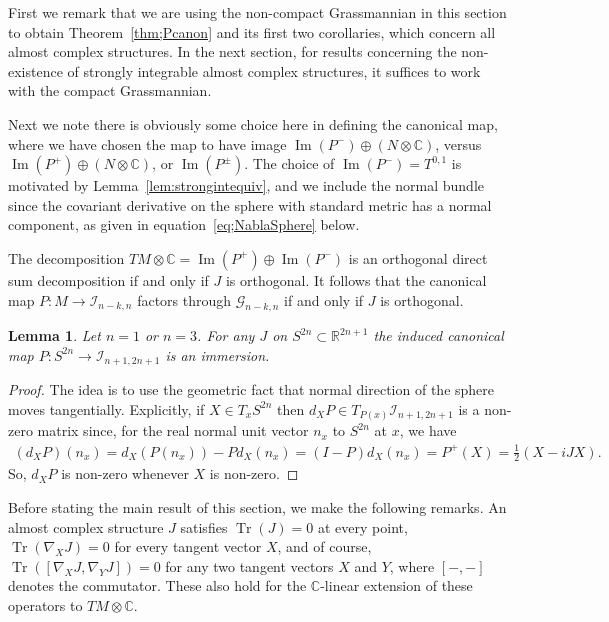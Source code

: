 \documentclass[10pt,a4paper]{amsart}
\DeclareMathOperator{\Tr}{Tr}
\newtheorem{lem}[thm]{Lemma}
\numberwithin{equation}{section}
\newcommand{\R}{\mathbb{R}}
\newcommand{\CC}{\mathbb{C}}
\newcommand{\cG}{{\mathcal G}}
\newcommand{\cI}{{\mathcal I}}
\begin{document}
First we remark that we are using the non-compact Grassmannian in this section to obtain Theorem~\ref{thm;Pcanon} and its first two corollaries, which concern all almost complex structures. In the next section, for results concerning the non-existence of strongly integrable almost complex structures, it suffices to work with the compact Grassmannian.

Next we note there is obviously some choice here in defining the canonical map, where we have chosen the map to have image $\operatorname{Im}(P^-) \oplus ( N \otimes \CC )$, versus $\operatorname{Im}(P^+) \oplus ( N \otimes \CC )$, or $\operatorname{Im}(P^\pm)$. The choice of $\operatorname{Im}(P^-)= T^{0,1}$ is motivated by Lemma~\ref{lem:strongintequiv}, and we include the normal bundle since the covariant derivative on the sphere with standard metric has a normal component, as given in equation~\eqref{eq;NablaSphere} below.

\begin{rmk}The decomposition $TM \otimes \CC = \operatorname{Im}(P^+) \oplus \operatorname{Im}(P^-)$ is an orthogonal direct sum decomposition if and only if $J$ is orthogonal. It follows that the canonical map $P\colon M \to \cI_{n-k,n}$ factors through $\cG_{n-k,n}$ if and only if $J$ is orthogonal.
\end{rmk}

\begin{lem} \label{lem;Pcanonemb}
Let $n=1$ or $n=3$. For any $J$ on $S^{2n} \subset \R^{2n+1}$ the induced canonical map $P\colon S^{2n} \to \cI_{n+1,2n+1}$ is an immersion.
\end{lem}

\begin{proof} The idea is to use the geometric fact that normal direction of the sphere moves tangentially. Explicitly, if $X \in T_xS^{2n}$ then $d_X P \in T_{P(x)} \cI_{n+1,2n+1}$ is a non-zero matrix since, for the real normal unit vector $n_x$ to $S^{2n}$ at $x$, we have
\begin{gather*}
(d_XP)(n_x) = d_X(P(n_x)) - P d_X(n_x) = (I-P) d_X(n_x) = P^+(X) = \frac 1 2 (X - i J X).
\end{gather*}
So, $d_X P$ is non-zero whenever $X$ is non-zero.
\end{proof}

Before stating the main result of this section, we make the following remarks. An almost complex structure $J$ satisfies $\Tr(J)=0$ at every point, $\Tr(\nabla_X J) =0$ for every tangent vector $X$, and of course, $\Tr ([\nabla_X J, \nabla_Y J] )=0$ for any two tangent vectors $X$ and $Y$, where $[-,-]$ denotes the commutator. These also hold for the $\CC$-linear extension of these operators to $TM \otimes \CC$.
\end{document}
